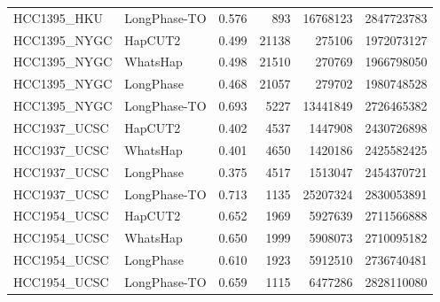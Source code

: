 \documentclass[pdflatex,sn-nature]{sn-jnl}
\begin{document}
\begin{table}[htbp]
\begin{tabular}{@{}llrrrr@{}}
    HCC1395\_HKU & LongPhase-TO & 0.576 & 893   & 16768123 & 2847723783 \\
    \addlinespace
    HCC1395\_NYGC & HapCUT2      & 0.499 & 21138 & 275106   & 1972073127 \\
    HCC1395\_NYGC & WhatsHap     & 0.498 & 21510 & 270769   & 1966798050 \\
    HCC1395\_NYGC & LongPhase    & 0.468 & 21057 & 279702   & 1980748528 \\
    HCC1395\_NYGC & LongPhase-TO & 0.693 & 5227  & 13441849 & 2726465382 \\
    \addlinespace
    HCC1937\_UCSC & HapCUT2      & 0.402 & 4537  & 1447908  & 2430726898 \\
    HCC1937\_UCSC & WhatsHap     & 0.401 & 4650  & 1420186  & 2425582425 \\
    HCC1937\_UCSC & LongPhase    & 0.375 & 4517  & 1513047  & 2454370721 \\
    HCC1937\_UCSC & LongPhase-TO & 0.713 & 1135  & 25207324 & 2830053891 \\
    \addlinespace
    HCC1954\_UCSC & HapCUT2      & 0.652 & 1969  & 5927639  & 2711566888 \\
    HCC1954\_UCSC & WhatsHap     & 0.650 & 1999  & 5908073  & 2710095182 \\
    HCC1954\_UCSC & LongPhase    & 0.610 & 1923  & 5912510  & 2736740481 \\
    HCC1954\_UCSC & LongPhase-TO & 0.659 & 1115  & 6477286  & 2828110080 \\
    \bottomrule
  \end{tabular}
\end{table}
\end{document}
